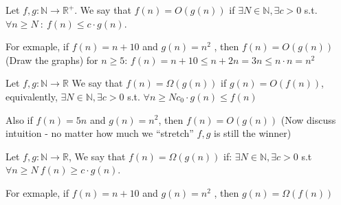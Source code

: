 \begin{definition}
  Let \( f, g : \mathbb{N} \rightarrow \mathbb{R}^{+} \). We say that \( f(n) = O(g(n))\)  if \( \exists N \in \mathbb{N}, \exists c > 0 \) s.t. \( \forall n \ge N \ : \ f(n) \le c \cdot g(n)\). 
\end{definition}
\begin{example}
  For exmaple, if \(f(n) = n + 10 \) and \( g(n) = n^2\)
, then \(f(n) = O(g(n)) \) (Draw the graphs) for \(n \ge 5 \):
\(f(n) = n + 10 \le n + 2n = 3n \le n \cdot n = n^2\)
\end{example}
\begin{figure}[h]
  \label{fig:bigO}
\end{figure}


\begin{definition} 
Let \( f, g : \mathbb{N} \rightarrow \mathbb{R} \)
We say that \(f(n) = \Omega(g(n))\) if \(g(n) = O(f(n))\), equivalently,
\( \exists N \in \mathbb{N}, \exists c > 0 \) s.t. \( \forall n \ge N c_0· g(n) \le f(n) \)
\end{definition}
\begin{example}
  Also if \( f(n) = 5n\) and \(g(n) = n^2\), then \(f(n) = O(g(n))\) (Now discuss intuition - no matter how much we “stretch” \(f, g\) is still the winner)
\end{example}

\begin{definition} 
Let \( f, g : \mathbb{N} \rightarrow \mathbb{R} \), We say that \(f(n) = \Omega(g(n))\) if:
\( \exists N \in \mathbb{N}, \exists c > 0 \) s.t \( \forall n \ge N \ f(n) \ge c \cdot g(n) \).
\end{definition}
\begin{example}
For exmaple, if \(f(n) = n + 10\) and \(g(n) = n^2\)
, then \(g(n) = \Omega(f(n))\)
\end{example}

